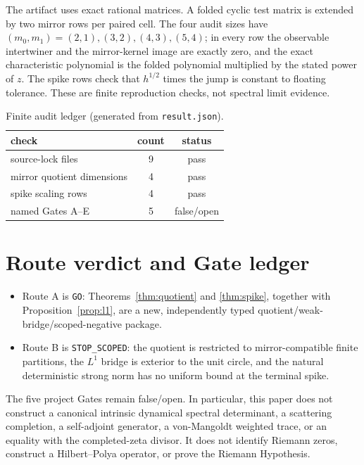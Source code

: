 \documentclass[11pt]{article}
\begin{document}
The artifact uses exact rational matrices.  A folded cyclic test matrix is
extended by two mirror rows per paired cell.  The four audit sizes have
$(m_0,m_1)=(2,1),(3,2),(4,3),(5,4)$; in every row the observable
intertwiner and the mirror-kernel image are exactly zero, and the exact
characteristic polynomial is the folded polynomial multiplied by the stated
power of $z$.  The spike rows check that $h^{1/2}$ times the jump is constant
to floating tolerance.  These are finite reproduction checks, not spectral
limit evidence.

\begin{table}[h]
\centering
\caption{Finite audit ledger (generated from \texttt{result.json}).}
\begin{tabular}{lcc}
\toprule
check & count & status\\
\midrule
source-lock files & 9 & pass\\
mirror quotient dimensions & 4 & pass\\
spike scaling rows & 4 & pass\\
named Gates A--E & 5 & false/open\\
\bottomrule
\end{tabular}
\end{table}

\section{Route verdict and Gate ledger}

\begin{itemize}[leftmargin=*]
\item Route A is \texttt{GO}: Theorems~\ref{thm:quotient} and
  \ref{thm:spike}, together with Proposition~\ref{prop:l1}, are a new,
  independently typed quotient/weak-bridge/scoped-negative package.
\item Route B is \texttt{STOP\_SCOPED}: the quotient is restricted to
  mirror-compatible finite partitions, the $L^1$ bridge is exterior to the
  unit circle, and the natural deterministic strong norm has no uniform
  bound at the terminal spike.
\end{itemize}

The five project Gates remain false/open.  In particular, this paper does not
construct a canonical intrinsic dynamical spectral determinant, a scattering
completion, a self-adjoint generator, a von-Mangoldt weighted trace, or an
equality with the completed-zeta divisor.  It does not identify Riemann zeros,
construct a Hilbert--Polya operator, or prove the Riemann Hypothesis.
\end{document}
